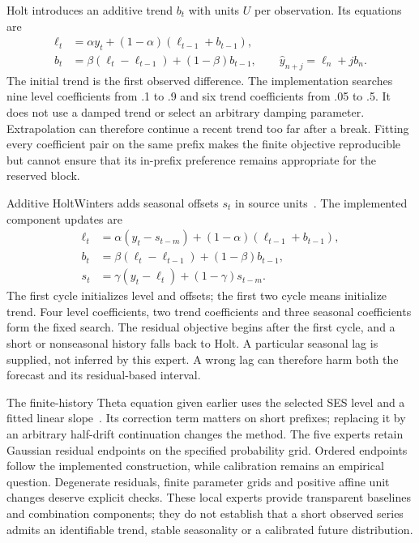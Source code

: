Holt introduces an additive trend $b_t$ with units $U$ per observation. Its equations are
\begin{align}\label{eq:report-holt}
\ell_t&=\alpha y_t+(1-\alpha)(\ell_{t-1}+b_{t-1}),\\
b_t&=\beta(\ell_t-\ell_{t-1})+(1-\beta)b_{t-1},\qquad
\widehat y_{n+j}=\ell_n+j b_n.
\end{align}
The initial trend is the first observed difference. The implementation searches nine level coefficients from .1 to .9 and six trend coefficients from .05 to .5. It does not use a damped trend or select an arbitrary damping parameter. Extrapolation can therefore continue a recent trend too far after a break. Fitting every coefficient pair on the same prefix makes the finite objective reproducible but cannot ensure that its in-prefix preference remains appropriate for the reserved block.

Additive HoltWinters adds seasonal offsets $s_t$ in source units~\cite{fpp}. The implemented component updates are
\begin{align}\label{eq:report-hw}
\ell_t&=\alpha(y_t-s_{t-m})+(1-\alpha)(\ell_{t-1}+b_{t-1}),\\
b_t&=\beta(\ell_t-\ell_{t-1})+(1-\beta)b_{t-1},\\
s_t&=\gamma(y_t-\ell_t)+(1-\gamma)s_{t-m}.
\end{align}
The first cycle initializes level and offsets; the first two cycle means initialize trend. Four level coefficients, two trend coefficients and three seasonal coefficients form the fixed search. The residual objective begins after the first cycle, and a short or nonseasonal history falls back to Holt. A particular seasonal lag is supplied, not inferred by this expert. A wrong lag can therefore harm both the forecast and its residual-based interval.

The finite-history Theta equation given earlier uses the selected SES level and a fitted linear slope~\cite{theta}. Its correction term matters on short prefixes; replacing it by an arbitrary half-drift continuation changes the method. The five experts retain Gaussian residual endpoints on the specified probability grid. Ordered endpoints follow the implemented construction, while calibration remains an empirical question. Degenerate residuals, finite parameter grids and positive affine unit changes deserve explicit checks. These local experts provide transparent baselines and combination components; they do not establish that a short observed series admits an identifiable trend, stable seasonality or a calibrated future distribution.

